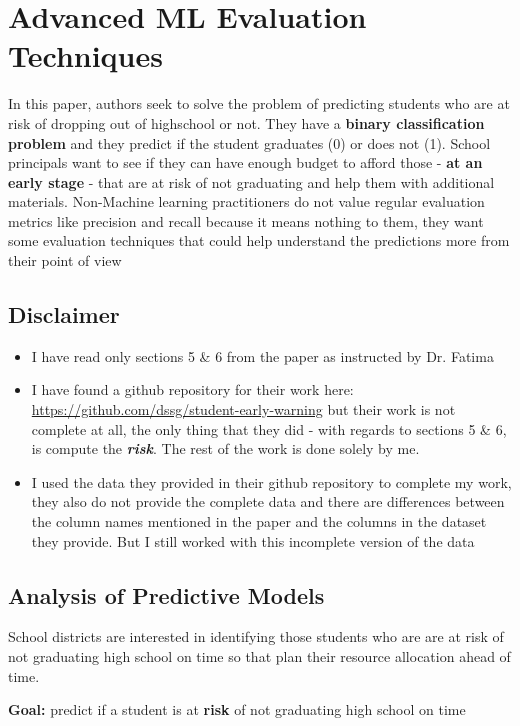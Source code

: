 \documentclass[11pt]{article}
\begin{document}
    \section{Advanced ML Evaluation Techniques}
In this paper, authors seek to solve the problem of predicting students who are at risk of dropping out of highschool or not. They have a \textbf{binary classification problem} and they predict if the student graduates (0) or does not (1). School principals want to see if they can have enough budget to afford those - \textbf{at an early stage} - that are at risk of not graduating and help them with additional materials. Non-Machine learning practitioners do not value regular evaluation metrics like precision and recall because it means nothing to them, they want some evaluation techniques that could help understand the predictions more from their point of view

\subsection*{Disclaimer}
\begin{itemize}
\item I have read only sections 5 \& 6 from the paper as instructed by Dr. Fatima
\item I have found a github repository for their work here: \url{https://github.com/dssg/student-early-warning} but their work is not complete at all, the only thing that they did - with regards to sections 5 \& 6, is compute the \textbf{\textit{risk}}. The rest of the work is done solely by me.
\item I used the data they provided in their github repository to complete my work, they also do not provide the complete data and there are differences between the column names mentioned in the paper and the columns in the dataset they provide. But I still worked with this incomplete version of the data
\end{itemize}

\subsection{Analysis of Predictive Models}
School districts are interested in identifying those students who are are at risk of not graduating high school on time so that plan their resource allocation ahead of time.

\noindent \textbf{Goal:} predict if a student is at \textbf{risk} of not graduating high school on time
\end{document}
